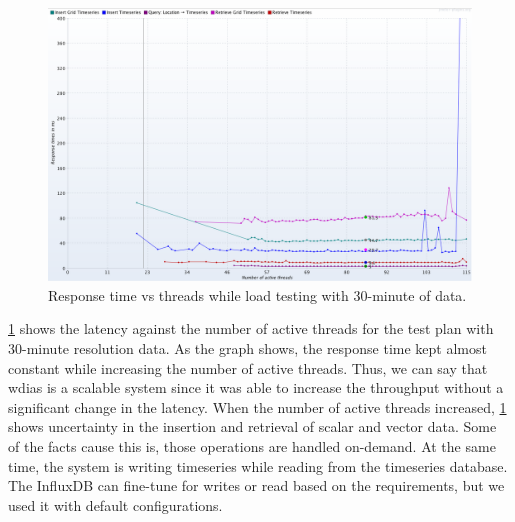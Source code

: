 \begin{figure}[htp]
    \centering
    \includegraphics[width=1.0\textwidth]{results/obs/all/obs_all_30m_response_times_vs_threads.png}
    \caption{Response time vs threads while load testing with 30-minute of data.}
    \label{fi:test_obs_all_30m_response_vs_threads}
\end{figure}

\cref{fi:test_obs_all_30m_response_vs_threads} shows the latency against the number of active threads for the test plan with 30-minute resolution data. As the graph shows, the response time kept almost constant while increasing the number of active threads. Thus, we can say that \acrshort{wdias} is a scalable system since it was able to increase the throughput without a significant change in the latency. When the number of active threads increased, \cref{fi:test_obs_all_30m_response_vs_threads} shows uncertainty in the insertion and retrieval of scalar and vector data. Some of the facts cause this is, those operations are handled on-demand. At the same time, the system is writing timeseries while reading from the timeseries database. The InfluxDB can fine-tune for writes or read based on the requirements, but we used it with default configurations.

